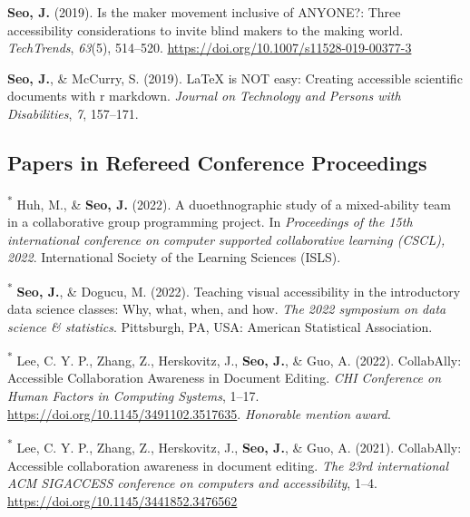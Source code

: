 \documentclass[11pt,a4paper,]{awesome-cv}
\begin{document}
\leavevmode{}%
\textbf{Seo, J.} (2019). Is the maker movement inclusive of {ANYONE}?:
Three accessibility considerations to invite blind makers to the making
world. \emph{{TechTrends}}, \emph{63}(5), 514--520.
\url{https://doi.org/10.1007/s11528-019-00377-3}

\leavevmode{}%
\textbf{Seo, J.}, \& McCurry, S. (2019). LaTeX is
NOT easy: Creating accessible scientific documents with r markdown.
\emph{Journal on Technology and Persons with Disabilities}, \emph{7},
157--171.

\hypertarget{papers-in-refereed-conference-proceedings}{%
  \subsection{Papers in Refereed Conference
    Proceedings}\label{papers-in-refereed-conference-proceedings}}

\hypertarget{refs_proceedings}{}

\leavevmode{}%
\textsuperscript{*} Huh, M., \& \textbf{Seo, J.} (2022). A
duoethnographic study of a mixed-ability team in a collaborative group
programming project. In \emph{Proceedings of the 15th international
  conference on computer supported collaborative learning (CSCL), 2022}.
International Society of the Learning Sciences (ISLS).

\leavevmode{}%
\textsuperscript{*} \textbf{Seo, J.}, \& Dogucu, M. (2022). Teaching
visual accessibility in the introductory data science classes: Why,
what, when, and how. \emph{The 2022 symposium on data science \&
  statistics}. {Pittsburgh, PA, USA}: American Statistical Association.

\leavevmode{}%
\textsuperscript{*} Lee, C. Y. P., Zhang, Z., Herskovitz, J.,
\textbf{Seo, J.}, \& Guo, A. (2022). {CollabAlly}: {Accessible
Collaboration Awareness} in {Document Editing}. \emph{{CHI Conference}
  on {Human Factors} in {Computing Systems}}, 1--17.
\url{https://doi.org/10.1145/3491102.3517635}. \emph{Honorable mention award}.

\leavevmode{}%
\textsuperscript{*} Lee, C. Y. P., Zhang, Z., Herskovitz, J.,
\textbf{Seo, J.}, \& Guo, A. (2021). CollabAlly: Accessible
collaboration awareness in document editing. \emph{The 23rd
  international ACM SIGACCESS conference on computers and accessibility},
1--4. \url{https://doi.org/10.1145/3441852.3476562}
\end{document}
